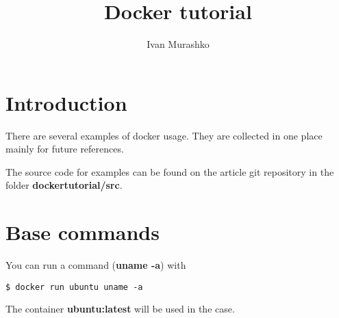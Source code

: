 \documentclass[14pt,a4paper]{article}
\title{Docker tutorial}
\author{Ivan Murashko}
\date{}
\begin{document}
\maketitle

\section*{Introduction}
There are several examples of docker usage. They are collected in one
place mainly for future references.

The source code for examples can be found on the article git
repository \cite{github:articles_ivanmurashko} in the folder 
\textbf{dockertutorial/src}.

\section{Base commands}

You can run a command (\textbf{uname -a}) with 
\begin{verbatim}
$ docker run ubuntu uname -a
\end{verbatim}
The container \textbf{ubuntu:latest} will be used in the case.

  
     
\end{document}
